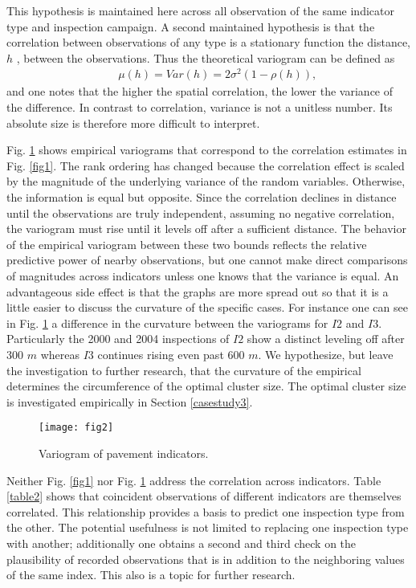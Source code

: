 \documentclass[Journal]{ascelike}
\begin{document}
This hypothesis is maintained here across all observation of the same indicator type and
inspection campaign. A second maintained hypothesis is that the correlation between
observations of any type is a stationary function the distance, $h$ , between the observations.
Thus the theoretical variogram can be defined as
\begin{eqnarray}
&& \mu(h)=Var(h)=2\sigma^2(1-\rho(h)),\label{varabh}
\end{eqnarray}
and one notes that the higher the spatial correlation, the lower the variance of the difference.
In contrast to correlation, variance is not a unitless number. Its absolute size is therefore
more difficult to interpret.

Fig. \ref{fig2} shows empirical variograms that correspond to the correlation estimates in Fig. \ref{fig1}. The rank
ordering has changed because the correlation effect is scaled by the magnitude of the underlying variance of the random 
variables. Otherwise, the information is equal but opposite. Since the correlation declines in distance until the 
observations are truly independent, assuming no negative correlation, the variogram must rise until it levels off after a sufficient distance. The 
behavior of the empirical variogram between these two bounds reflects the relative predictive power of nearby observations, but 
one cannot make direct comparisons of magnitudes across indicators unless one knows that the variance is equal. An 
advantageous side effect is that the graphs are more spread out so that it is a little easier to discuss the curvature 
of the specific cases. For instance one can see in Fig. \ref{fig2} a difference in the curvature between the variograms 
for $I2$ and $I3$. Particularly the 2000 and 2004 inspections of $I2$ show a distinct leveling off after $300$ $m$ 
whereas $I3$ continues rising even past $600$ $m$. We hypothesize, but leave the investigation to further research, that 
the curvature of the empirical determines the circumference of the optimal cluster size. The optimal cluster size is 
investigated empirically in Section \ref{casestudy3}.
%
\begin{figure}
\centering
\texttt{[image: fig2]} 
\caption{Variogram of pavement indicators.} 
\label{fig2}
\end{figure}

Neither Fig. \ref{fig1} nor Fig. \ref{fig2} address the correlation across indicators. Table \ref{table2} shows that
coincident observations of different indicators are themselves correlated. This relationship provides a basis to predict 
one inspection type from the other. The potential usefulness is not limited to replacing one inspection type with 
another; additionally one obtains a second and third check on the plausibility of recorded observations that is in addition to 
the neighboring values of the same index. This also is a topic for further research.
\end{document}
